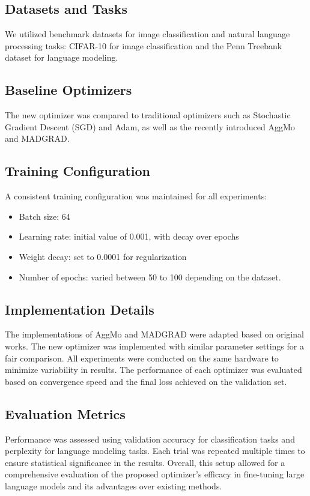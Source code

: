 \documentclass{article} %
\begin{document}
\subsection{Datasets and Tasks}
We utilized benchmark datasets for image classification and natural language processing tasks: CIFAR-10 for image classification and the Penn Treebank dataset for language modeling.
\subsection{Baseline Optimizers}
The new optimizer was compared to traditional optimizers such as Stochastic Gradient Descent (SGD) and Adam, as well as the recently introduced AggMo and MADGRAD.
\subsection{Training Configuration}
A consistent training configuration was maintained for all experiments: \begin{itemize}  \item Batch size: 64  \item Learning rate: initial value of 0.001, with decay over epochs  \item Weight decay: set to 0.0001 for regularization  \item Number of epochs: varied between 50 to 100 depending on the dataset. \end{itemize}
\subsection{Implementation Details}
The implementations of AggMo and MADGRAD were adapted based on original works. The new optimizer was implemented with similar parameter settings for a fair comparison. All experiments were conducted on the same hardware to minimize variability in results.
The performance of each optimizer was evaluated based on convergence speed and the final loss achieved on the validation set.
\subsection{Evaluation Metrics}
Performance was assessed using validation accuracy for classification tasks and perplexity for language modeling tasks. Each trial was repeated multiple times to ensure statistical significance in the results. Overall, this setup allowed for a comprehensive evaluation of the proposed optimizer's efficacy in fine-tuning large language models and its advantages over existing methods.
\end{document}
